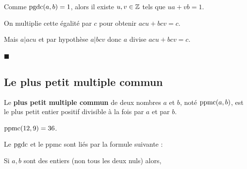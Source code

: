 \begin{demonstration}
Comme $\textrm{pgdc}(a,b)=1$, alors il existe $u,v\in \mathbb{Z}$ tels que
$ua+vb=1$.

\smallskip
On multiplie cette égalité par $c$ pour obtenir
$acu + bcv = c$.

\smallskip
Mais $a|acu$ et par hypothèse $a|bcv$ donc
$a$ divise $acu+bcv=c$.

\vspace{-3mm}\hfill $\blacksquare$
\end{demonstration}

\pagebreak

\subsection*{Le plus petit multiple commun}

\begin{definition}
Le \textbf{plus petit multiple commun} de deux nombres $a$ et $b$, noté $\textrm{ppmc}(a,b)$,
est le plus petit entier positif divisible à la fois par $a$ et par $b$.
\end{definition}

\begin{exemple}$\textrm{ppmc}(12,9)=36$.
\end{exemple}

Le $\textrm{pgdc}$ et le ppmc sont liés par la formule suivante :

\medskip
\begin{proposition}
Si $a,b$ sont des entiers (non tous les deux nuls) alors,

\begin{center}
\end{center}
\end{proposition}

